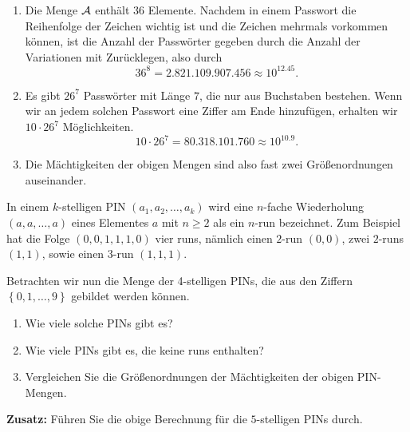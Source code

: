 \solution 
\begin{enumerate}
    \item Die Menge $\mathcal A$ enthält $36$ Elemente. Nachdem in einem Passwort die
        Reihenfolge der Zeichen wichtig ist und die Zeichen mehrmals vorkommen
        können, ist die Anzahl der Passwörter gegeben durch die Anzahl der
        Variationen mit Zurücklegen, also durch
        \begin{equation}
            36^{8} = 2.821.109.907.456 \approx 10^{12.45}.
        \end{equation}
    \item Es gibt $26^7$ Passwörter mit Länge $7$, die nur aus Buchstaben bestehen. 
        Wenn wir an jedem solchen Passwort eine Ziffer am Ende hinzufügen, 
        erhalten wir $10\cdot 26^7$ Möglichkeiten. 
        \begin{equation}
            10\cdot 26^7 = 80.318.101.760 \approx 10^{10.9}.
        \end{equation}
    \item Die Mächtigkeiten der obigen Mengen sind also fast zwei Größenordnungen 
        auseinander.
\end{enumerate}



In einem $k$-stelligen PIN $(a_1,a_2,\dots ,a_k)$ wird eine $n$-fache
Wiederholung $(a,a,\dots ,a)$ eines Elementes $a$ mit $n\geq 2$ als ein $n$-run
bezeichnet.  Zum Beispiel hat die Folge $(0, 0, 1, 1, 1, 0)$ vier runs, nämlich
einen $2$-run $(0,0)$, zwei $2$-runs $(1,1)$, sowie einen $3$-run $(1,1,1)$.

Betrachten wir nun die Menge der 4-stelligen PINs, die aus den Ziffern $\left\{
0,1, \dots, 9 \right\}$ gebildet werden können. 
\begin{enumerate}
    \item Wie viele solche PINs gibt es?
    \item Wie viele PINs gibt es, die keine runs enthalten?
    \item Vergleichen Sie die Größenordnungen der Mächtigkeiten der obigen
        PIN-Mengen. 
\end{enumerate}
\textbf{Zusatz:} Führen Sie die obige Berechnung für die $5$-stelligen PINs durch.

